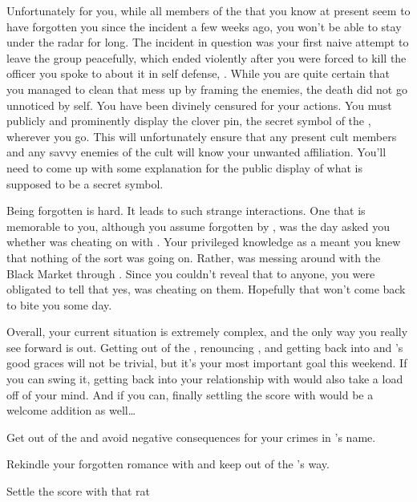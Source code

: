 \documentclass[char]{GL2020}
\begin{document}
Unfortunately for you, while all members of the \pGoaties{} that you know at present seem to have forgotten you since the incident a few weeks ago, you won’t be able to stay under the radar for long. The incident in question was your first naive attempt to leave the group peacefully, which ended violently after you were forced to kill the officer you spoke to about it in self defense, \cJoeKill{}. While you are quite certain that you managed to clean that mess up by framing the \pGoaties{} enemies, the death did not go unnoticed by \pGoat{} \cGenesis{\them}self. You have been divinely censured for your actions. You must publicly and prominently display the clover pin, the secret symbol of the \pGoaties{}, wherever you go. This will unfortunately ensure that any present cult members and any savvy enemies of the cult will know your unwanted affiliation. You’ll need to come up with some explanation for the public display of what is supposed to be a secret symbol.

Being forgotten is hard. It leads to such strange interactions. One that is memorable to you, although you assume forgotten by \cLibrarian{\them}, was the day \cLibrarian{} asked you whether \cEthics{} was cheating on \cLibrarian{} with \cChupSecond{}. Your privileged knowledge as a \pGoaties{} meant you knew that nothing of the sort was going on. Rather, \cEthics{} was messing around with the Black Market through \cChupSecond{}. Since you couldn’t reveal that to anyone, you were obligated to tell \cLibrarian{} that yes, \cEthics{} was cheating on them. Hopefully that won’t come back to bite you some day.

Overall, your current situation is extremely complex, and the only way you really see forward is out. Getting out of the \pGoaties{}, renouncing \pGoat{}, and getting back into \cEbb{} and \cFlow{}’s good graces will not be trivial, but it’s your most important goal this weekend. If you can swing it, getting back into your relationship with \cHeadScientist{} would also take a load off of your mind. And if you can, finally settling the score with \cDiplomat{} would be a welcome addition as well\ldots

\begin{itemz}[Goals]
	\item Get out of the \pGoaties{} and avoid negative consequences for your crimes in \pGoat{}’s name.
	\item Rekindle your forgotten romance with \cHeadScientist{} and keep \cHeadScientist{\them} out of the \pGoaties{}’s way.
	\item Settle the score with that rat \cDiplomat{}
\end{itemz}
\end{document}
